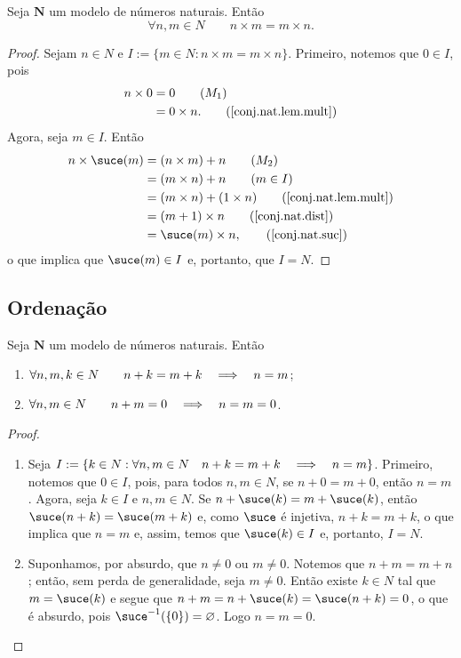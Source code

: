 \begin{teo}
	Seja $\bm N$ um modelo de números naturais. Então
	\begin{equation*}
	\forall n,m \in N \qquad n \times m = m \times n.
	\end{equation*}
\end{teo}
\begin{proof}
	Sejam $n \in N$ e $I := \{m \in N:n \times m=m \times n\}$. Primeiro, notemos que $0 \in I$, pois
	\begin{align*}
	n \times 0 &= 0 													\tag{$M_1$} \\
		&= 0 \times n.													\tag{\ref{conj.nat.lem.mult}}
	\end{align*}
Agora, seja $m \in I$. Então
	\begin{align*}
	n \times \suce(m) &= (n \times m) + n							\tag{$M_2$} \\
		&= (m \times n) + n											\tag{$m \in I$} \\
		&= (m \times n) + (1 \times n)							\tag{\ref{conj.nat.lem.mult}} \\
		&= (m +1) \times n											\tag{\ref{conj.nat.dist}} \\
		&= \suce(m) \times n,												\tag{\ref{conj.nat.suc}}
	\end{align*}
o que implica que $\suce(m) \in I$ e, portanto, que $I=N$.
\end{proof}

\subsection{Ordenação}

\begin{lema}
	Seja $\bm N$ um modelo de números naturais. Então
	\begin{enumerate}
	\item $\forall n,m,k \in N \qquad n+k=m+k \quad \Longrightarrow \quad n=m$;
	\item $\forall n,m \in N \qquad n+m = 0 \quad \Longrightarrow \quad n=m=0$.
	\end{enumerate}
\end{lema}
\begin{proof}
	\begin{enumerate}
	\item Seja $I := \{k \in N: \forall n,m \in N \quad n+k=m+k \quad \Longrightarrow \quad n=m\}$. Primeiro, notemos que $0 \in I$, pois, para todos $n,m \in N$, se $n+0=m+0$, então $n=m$. Agora, seja $k \in I$ e $n,m \in N$. Se $n+\suce(k)=m+\suce(k)$, então $\suce(n+k)=\suce(m+k)$ e, como $\suce$ é injetiva, $n+k=m+k$, o que implica que $n=m$ e, assim, temos que $\suce(k) \in I$ e, portanto, $I=N$.
	
	\item Suponhamos, por absurdo, que $n \neq 0$ ou $m \neq 0$. Notemos que $n+m=m+n$; então, sem perda de generalidade, seja $m \neq 0$. Então existe $k \in N$ tal que $m=\suce(k)$ e segue que $n+m=n+\suce(k)=\suce(n+k)=0$, o que é absurdo, pois $\suce^{-1}(\{0\})=\emptyset$. Logo $n=m=0$.
	\end{enumerate}
\end{proof}

